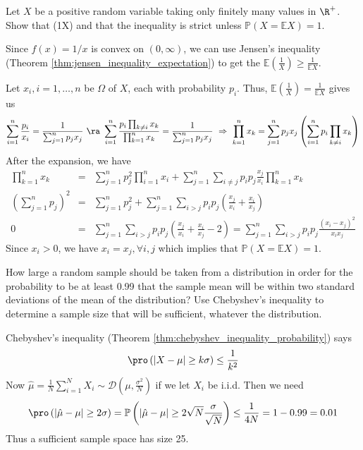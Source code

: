 \begin{problem}
Let $X$ be a positive random variable taking only finitely many values in $\R^+$. Show that
\be
{}\left(\frac 1X\right)\geq {}
\ee
and that the inequality is strict unless $\mathbb{P}(X=\mathbb{E}X)=1$.
\end{problem}

\begin{solution}[\bf Solution.]
Since $f(x) = 1/x$ is convex on $(0,\infty)$, we can use Jensen's inequality (Theorem \ref{thm:jensen_inequality_expectation}) to get the $\mathbb{E}\left(\frac 1X\right)\geq \frac{1}{\mathbb{E}X}$.

Let $x_i,i=1,\dots,n$ be $\Omega$ of $X$, each with probability $p_i$. Thus, $\mathbb{E}\left(\frac 1X\right)= \frac{1}{\mathbb{E}X}$ gives us
\begin{equation}
\sum^n_{i=1}\frac{p_i}{x_i} = \frac{1}{\sum^n_{j=1}p_jx_j}\ \ra \ \sum^n_{i=1}\frac{p_i\prod_{k\ne i}x_k}{\prod^n_{k=1}x_k} = \frac{1}{\sum^n_{j=1}p_jx_j}\ \Rightarrow \ \prod^n_{k=1}x_k = \sum^n_{j=1}p_jx_j\left(\sum^n_{i=1}p_i\prod_{k\ne i}x_k\right)
\end{equation}
After the expansion, we have
\begin{eqnarray}
\prod^n_{k=1}x_k & = & \sum^n_{j=1}p_j^2 \prod^n_{i=1}x_i + \sum^n_{j=1}\sum_{i\ne j}p_ip_j \frac{x_j}{x_i}\prod^n_{k=1}x_k \nonumber\\
\left(\sum^n_{j=1}p_j\right)^2 & = & \sum^n_{j=1}p_j^2 + \sum^n_{j=1}\sum_{i> j}p_ip_j \left(\frac{x_j}{x_i}+ \frac{x_i}{x_j}\right) \nonumber\\
0 & = & \sum^n_{j=1}\sum_{i> j}p_ip_j \left(\frac{x_j}{x_i}+ \frac{x_i}{x_j}-2\right) = \sum^n_{j=1}\sum_{i> j}p_ip_j\frac{(x_i-x_j)^2}{x_ix_j}
\end{eqnarray}
Since $x_i>0$, we have $x_i=x_j,\forall i,j$ which implies that $\mathbb{P}(X=\mathbb{E}X)=1$.
\end{solution}


\begin{problem}
How large a random sample should be taken from a distribution in order for the probability to be at least 0.99 that the sample mean will be within two standard deviations of the mean of the distribution? Use Chebyshev's inequality to determine a sample size that will be sufficient, whatever the distribution.
\end{problem}

\begin{solution}[\bf Solution.]
Chebyshev's inequality (Theorem \ref{thm:chebyshev_inequality_probability}) says
\begin{equation}
\pro\left(|X-\mu|\geq k\sigma \right)\leq \frac{1}{k^2}
\end{equation}
Now $\hat{\mu} = \frac{1}{N}\sum^N_{i=1}X_i\sim \mathcal{D}(\mu,\frac{\sigma^2}{N})$ if we let $X_i$ be i.i.d. Then we need
\begin{equation}
\pro\left(|\hat{\mu}-\mu|\geq 2\sigma \right) = \mathbb{P}\left(|\hat{\mu}-\mu|\geq 2\sqrt{N}\frac{\sigma}{\sqrt{N}} \right)\leq \frac{1}{4N}=1-0.99=0.01
\end{equation}
Thus a sufficient sample space has size 25.
\end{solution}

